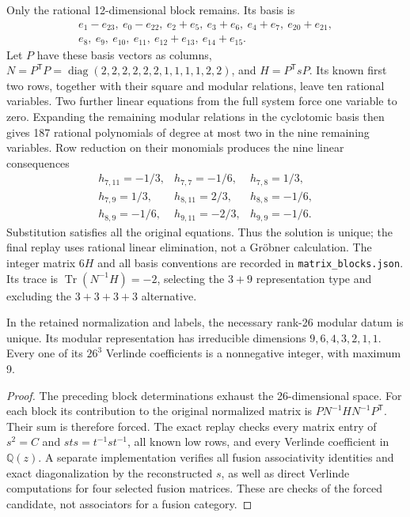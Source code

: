 Only the rational 12-dimensional block remains. Its basis is
\[
\begin{gathered}
e_1-e_{23},\ e_0-e_{22},\ e_2+e_5,\ e_3+e_6,\ e_4+e_7,
\ e_{20}+e_{21},\\
e_8,\ e_9,\ e_{10},\ e_{11},\ e_{12}+e_{13},\ e_{14}+e_{15}.
\end{gathered}
\]
Let $P$ have these basis vectors as columns,
$N=P^{\mathsf T}P=\operatorname{diag}(2,2,2,2,2,2,1,1,1,1,2,2)$,
and $H=P^{\mathsf T}sP$. Its known first two rows, together with their
square and modular relations, leave ten rational variables. Two further
linear equations from the full system force one variable to zero.
Expanding the remaining modular relations in the cyclotomic basis then
gives 187 rational polynomials of degree at most two in the nine remaining
variables. Row reduction on their
monomials produces the nine linear consequences
\[
\begin{array}{lll}
h_{7,11}=-1/3,&h_{7,7}=-1/6,&h_{7,8}=1/3,\\
h_{7,9}=1/3,&h_{8,11}=2/3,&h_{8,8}=-1/6,\\
h_{8,9}=-1/6,&h_{9,11}=-2/3,&h_{9,9}=-1/6.
\end{array}
\]
Substitution satisfies all the original equations. Thus the solution
is unique; the final replay uses rational linear elimination, not a
Gr\"obner calculation. The integer matrix $6H$ and all basis conventions
are recorded in \texttt{matrix\_blocks.json}. Its trace is
$\operatorname{Tr}(N^{-1}H)=-2$, selecting the $3+9$ representation
type and excluding the $3+3+3+3$ alternative.

\begin{theorem}
In the retained normalization and labels, the necessary rank-26
modular datum is unique. Its modular representation has irreducible
dimensions $9,6,4,3,2,1,1$. Every one of its $26^3$ Verlinde
coefficients is a nonnegative integer, with maximum 9.
\end{theorem}
\begin{proof}
The preceding block determinations exhaust the 26-dimensional space.
For each block its contribution to the original normalized matrix is
$PN^{-1}HN^{-1}P^{\mathsf T}$. Their sum is therefore forced.
The exact replay checks every matrix entry of $s^2=C$ and
$sts=t^{-1}st^{-1}$, all known low rows, and every Verlinde coefficient
in $\mathbb Q(z)$. A separate implementation verifies all fusion
associativity identities and exact diagonalization by the reconstructed
$s$, as well as direct Verlinde computations for four selected fusion
matrices. These are checks of the forced candidate, not associators
for a fusion category.
\end{proof}

